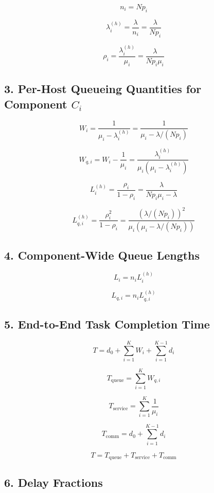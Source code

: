 \documentclass[12pt,a4paper]{article}
\begin{document}
\[
n_i = N p_i
\]

\[
\lambda_i^{(h)} = \frac{\lambda}{n_i}
                = \frac{\lambda}{Np_i}
\]

\[
\rho_i = \frac{\lambda_i^{(h)}}{\mu_i}
       = \frac{\lambda}{Np_i\mu_i}
\]

\subsection*{3. Per-Host Queueing Quantities for Component $C_i$}

\[
W_i
= \frac{1}{\mu_i - \lambda_i^{(h)}}
= \frac{1}{\mu_i - \lambda/(Np_i)}
\]

\[
W_{q,i}
= W_i - \frac{1}{\mu_i}
= \frac{\lambda_i^{(h)}}{\mu_i(\mu_i-\lambda_i^{(h)})}
\]

\[
L_i^{(h)}
= \frac{\rho_i}{1-\rho_i}
= \frac{\lambda}{Np_i\mu_i - \lambda}
\]

\[
L_{q,i}^{(h)}
= \frac{\rho_i^2}{1-\rho_i}
= \frac{\left(\lambda/(Np_i)\right)^2}{\mu_i(\mu_i - \lambda/(Np_i))}
\]

\subsection*{4. Component-Wide Queue Lengths}

\[
L_i = n_i L_i^{(h)}
\]

\[
L_{q,i} = n_i L_{q,i}^{(h)}
\]

\subsection*{5. End-to-End Task Completion Time}

\[
T = d_0 + \sum_{i=1}^{K} W_i + \sum_{i=1}^{K-1} d_i
\]

\[
T_{\text{queue}} = \sum_{i=1}^{K} W_{q,i}
\]

\[
T_{\text{service}} = \sum_{i=1}^{K} \frac{1}{\mu_i}
\]

\[
T_{\text{comm}} = d_0 + \sum_{i=1}^{K-1} d_i
\]

\[
T = T_{\text{queue}}
  + T_{\text{service}}
  + T_{\text{comm}}
\]

\subsection*{6. Delay Fractions}
\end{document}
